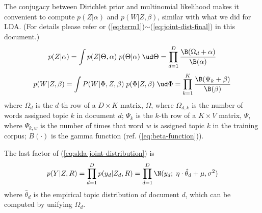 The conjugacy between Dirichlet prior and multinomial likelihood makes
it convenient to compute $p(Z|\alpha)$ and $p(W|Z,\beta)$, similar
with what we did for LDA. (For details please refer \cite{heinrich} or
(\ref{eq:term1})$\sim$(\ref{eq:joint-dist-final}) in this document.)
\begin{equation}
  \label{eq:gen-Z}
  p(Z|\alpha)
  =
  \int p(Z|\Theta,\alpha) \; p(\Theta|\alpha) \; \ud\Theta
  =
  \prod_{d=1}^D
  \frac{\B(\Omega_d+\alpha)}{\B(\alpha)}
\end{equation}
\begin{equation}
  \label{eq:gen-W}
  p(W|Z,\beta)
  =
  \int P(W|\Phi,Z,\beta) \; p(\Phi|Z,\beta) \; \ud\Phi
  =
  \prod_{k=1}^K
  \frac{\B(\Psi_k+\beta)}{\B(\beta)}
\end{equation}
where $\Omega_d$ is the $d$-th row of a $D\times{}K$ matrix, $\Omega$,
where $\Omega_{d,k}$ is the number of words assigned topic $k$ in
document $d$; $\Psi_k$ is the $k$-th row of a $K\times{}V$ matrix,
$\Psi$, where $\Psi_{k,w}$ is the number of times that word $w$ is
assigned topic $k$ in the training corpus; $B(\cdot)$ is the gamma
function (ref. (\ref{eq:beta-function})).

The last factor of (\ref{eq:slda-joint-distribution}) is
\begin{equation}
  \label{eq:gen-rate}
  p(Y|Z,R) =
  \prod_{d=1}^D p(y_d|Z_d,R) =
  \prod_{d=1}^D \N(y_d; \; \eta \cdot \hat{\theta}_d + \mu, \sigma^2)
\end{equation}
where $\hat{\theta}_d$ is the empirical topic distribution of document
$d$, which can be computed by unifying $\Omega_d$.

